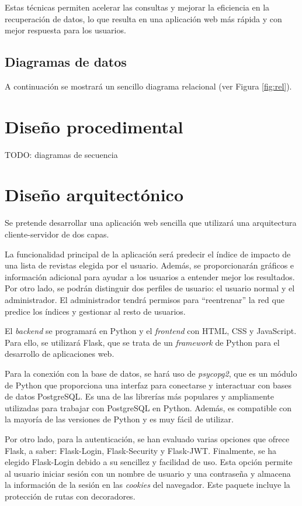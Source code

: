 Estas técnicas permiten acelerar las consultas y mejorar la eficiencia en la recuperación de datos, lo que resulta en una aplicación web más rápida y con mejor respuesta para los usuarios.

\subsection{Diagramas de datos}
A continuación se mostrará un sencillo diagrama relacional (ver Figura \ref{fig:rel}).



\section{Diseño procedimental}
TODO: diagramas de secuencia

\section{Diseño arquitectónico}

Se pretende desarrollar una aplicación web sencilla que utilizará una arquitectura cliente-servidor de dos capas.

La funcionalidad principal de la aplicación será predecir el índice de impacto de una lista de revistas elegida por el usuario. Además, se proporcionarán gráficos e información adicional para ayudar a los usuarios a entender mejor los resultados. Por otro lado, se podrán distinguir dos perfiles de usuario: el usuario normal y el administrador. El administrador tendrá permisos para ``reentrenar'' la red que predice los índices y gestionar al resto de usuarios.

El \textit{backend} se programará en Python y el \textit{frontend} con HTML, CSS y JavaScript. Para ello, se utilizará Flask, que se trata de un \textit{framework} de Python para el desarrollo de aplicaciones web.

Para la conexión con la base de datos, se hará uso de \textit{psycopg2}, que es un módulo de Python que proporciona una interfaz para conectarse y interactuar con bases de datos PostgreSQL. 
Es una de las librerías más populares y ampliamente utilizadas para trabajar con PostgreSQL en Python. Además, es compatible con la mayoría de las versiones de Python y es muy fácil de utilizar.

Por otro lado, para la autenticación, se han evaluado varias opciones que ofrece Flask, a saber: Flask-Login, Flask-Security y Flask-JWT. 
Finalmente, se ha elegido Flask-Login debido a su sencillez y facilidad de uso. Esta opción permite al usuario iniciar sesión con un nombre de usuario y una contraseña y almacena la información de la sesión en las \textit{cookies} del navegador. Este paquete incluye la protección de rutas con decoradores.


